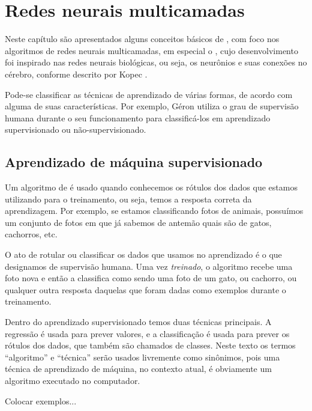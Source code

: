 
\chapter{Redes neurais multicamadas}

Neste capítulo são apresentados alguns conceitos básicos de , com foco nos algoritmos de redes neurais multicamadas, em especial o , cujo desenvolvimento foi inspirado nas redes neurais biológicas, ou seja, os neurônios e suas conexões no cérebro, conforme descrito por Kopec \citep{classic}.

Pode-se classificar as técnicas de aprendizado de várias formas, de acordo com alguma de suas características. Por exemplo, Géron \citep{hands} utiliza o grau de supervisão humana durante o seu funcionamento para classificá-los em aprendizado supervisionado ou não-supervisionado.

\section{Aprendizado de máquina supervisionado}

 Um algoritmo de  é usado quando conhecemos os rótulos dos dados que estamos utilizando para o treinamento, ou seja, temos a resposta correta da aprendizagem. Por exemplo, se estamos classificando fotos de animais, possuímos um conjunto de fotos em que já sabemos de antemão quais são de gatos, cachorros, etc.

 O ato de rotular ou classificar os dados que usamos no aprendizado é o que designamos de supervisão humana. Uma vez \emph{treinado}, o algoritmo recebe uma foto nova e então a classifica como sendo uma foto de um gato, ou cachorro, ou qualquer outra resposta daquelas que foram dadas como exemplos durante o treinamento.

Dentro do aprendizado supervisionado temos duas técnicas principais. A regressão é usada para prever valores, e a classificação é usada para prever os rótulos dos dados, que também são chamados de classes. Neste texto os termos ``algoritmo'' e ``técnica'' serão usados livremente como sinônimos, pois uma técnica de aprendizado de máquina, no contexto atual, é obviamente um algoritmo executado no computador.

Colocar exemplos...

